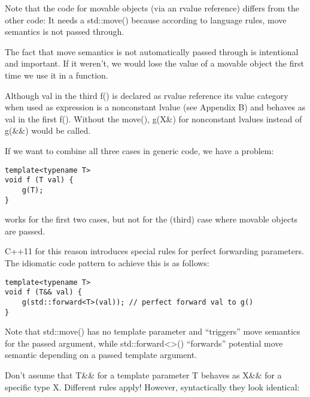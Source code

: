 Note that the code for movable objects (via an rvalue reference) differs from the other code: It needs a std::move() because according to language rules, move semantics is not passed through.

\begin{tcolorbox}[colback=webgreen!5!white,colframe=webgreen!75!black]
\hspace*{0.75cm}The fact that move semantics is not automatically passed through is intentional and important. If it weren’t, we would lose the value of a movable object the first time we use it in a function.
\end{tcolorbox}

Although val in the third f() is declared as rvalue reference its value category when used as expression is a nonconstant lvalue (see Appendix B) and behaves as val in the first f(). Without the move(), g(X\&) for nonconstant lvalues instead of g(\&\&) would be called.

If we want to combine all three cases in generic code, we have a problem:

\begin{lstlisting}[style=styleCXX]
template<typename T>
void f (T val) {
	g(T);
}
\end{lstlisting}

works for the first two cases, but not for the (third) case where movable objects are passed.

C++11 for this reason introduces special rules for perfect forwarding parameters. The idiomatic code pattern to achieve this is as follows:

\begin{lstlisting}[style=styleCXX]
template<typename T>
void f (T&& val) {
	g(std::forward<T>(val)); // perfect forward val to g()
}
\end{lstlisting}

Note that std::move() has no template parameter and “triggers” move semantics for the passed argument, while std::forward<>() “forwards” potential move semantic depending on a passed  template argument. 

Don’t assume that T\&\& for a template parameter T behaves as X\&\& for a specific type X. Different rules apply! However, syntactically they look identical:

